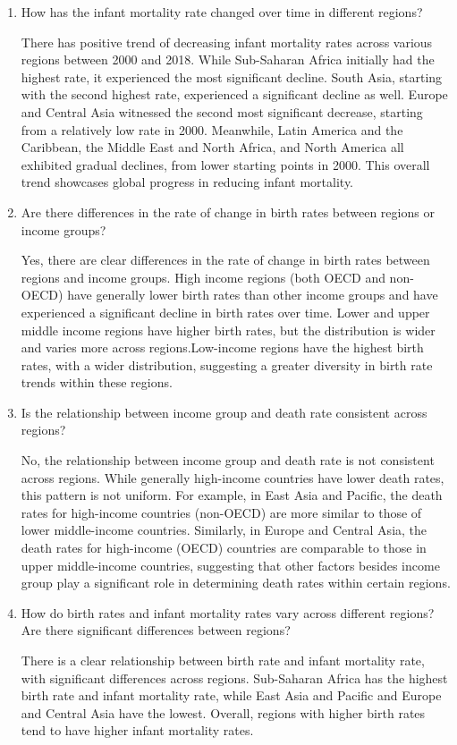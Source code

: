 \documentclass{article}\usepackage[]{graphicx}\usepackage[]{xcolor}
\begin{document}
\begin{enumerate}
    \item How has the infant mortality rate changed over time in different regions?
    
    There has positive trend of decreasing infant mortality rates across various regions between 2000 and 2018. While Sub-Saharan Africa initially had the highest rate, it experienced the most significant decline. South Asia, starting with the second highest rate, experienced a significant decline as well. Europe and Central Asia witnessed the second most significant decrease, starting from a relatively low rate in 2000. Meanwhile, Latin America and the Caribbean, the Middle East and North Africa, and North America all exhibited gradual declines, from lower starting points in 2000. This overall trend showcases global progress in reducing infant mortality.
    
    \item Are there differences in the rate of change in birth rates between regions or income groups?
    
    Yes, there are clear differences in the rate of change in birth rates between regions and income groups. High income regions (both OECD and non-OECD) have generally lower birth rates than other income groups and have experienced a significant decline in birth rates over time.
Lower and upper middle income regions have higher birth rates, but the distribution is wider and varies more across regions.Low-income regions have the highest birth rates, with a wider distribution, suggesting a greater diversity in birth rate trends within these regions.

    \item Is the relationship between income group and death rate consistent across regions?
    
    No, the relationship between income group and death rate is not consistent across regions. While generally high-income countries have lower death rates, this pattern is not uniform. For example, in East Asia and Pacific, the death rates for high-income countries (non-OECD) are more similar to those of lower middle-income countries. Similarly, in Europe and Central Asia, the death rates for high-income (OECD) countries are comparable to those in upper middle-income countries, suggesting that other factors besides income group play a significant role in determining death rates within certain regions.
    
    \item How do birth rates and infant mortality rates vary across different regions? Are there significant differences between regions?
    
    There is a clear relationship between birth rate and infant mortality rate, with significant differences across regions. Sub-Saharan Africa has the highest birth rate and infant mortality rate, while East Asia and Pacific and Europe and Central Asia have the lowest. Overall, regions with higher birth rates tend to have higher infant mortality rates.
\end{enumerate}
\end{document}

